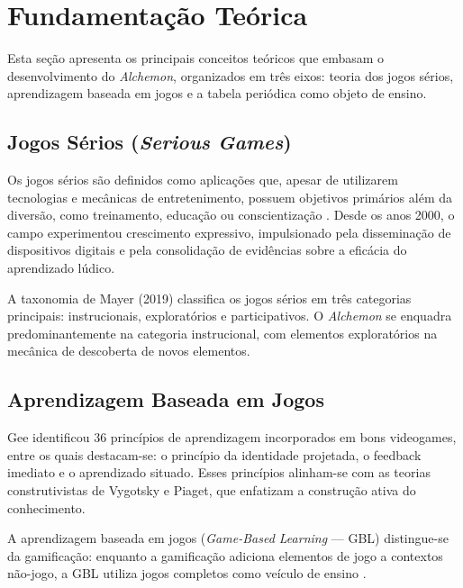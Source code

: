 
\section{Fundamentação Teórica}

Esta seção apresenta os principais conceitos teóricos que embasam o
desenvolvimento do \textit{Alchemon}, organizados em três eixos: teoria dos
jogos sérios, aprendizagem baseada em jogos e a tabela periódica como objeto
de ensino.

\subsection{Jogos Sérios (\textit{Serious Games})}

Os jogos sérios são definidos como aplicações que, apesar de utilizarem
tecnologias e mecânicas de entretenimento, possuem objetivos primários além
da diversão, como treinamento, educação ou conscientização
\cite{mayer2019serious}. Desde os anos 2000, o campo experimentou crescimento
expressivo, impulsionado pela disseminação de dispositivos digitais e pela
consolidação de evidências sobre a eficácia do aprendizado lúdico.

A taxonomia de Mayer (2019) classifica os jogos sérios em três categorias
principais: instrucionais, exploratórios e participativos. O \textit{Alchemon}
se enquadra predominantemente na categoria instrucional, com elementos
exploratórios na mecânica de descoberta de novos elementos.


\subsection{Aprendizagem Baseada em Jogos}

Gee \cite{gee2003videogames} identificou 36 princípios de aprendizagem
incorporados em bons videogames, entre os quais destacam-se: o princípio da
identidade projetada, o feedback imediato e o aprendizado situado. Esses
princípios alinham-se com as teorias construtivistas de Vygotsky e Piaget,
que enfatizam a construção ativa do conhecimento.

A aprendizagem baseada em jogos (\textit{Game-Based Learning} — GBL) distingue-se
da gamificação: enquanto a gamificação adiciona elementos de jogo a contextos
não-jogo, a GBL utiliza jogos completos como veículo de ensino \cite{prensky2001digital}.

